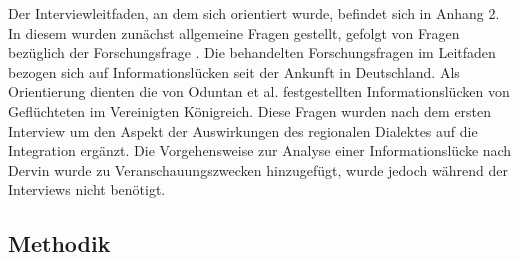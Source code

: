 

Der Interviewleitfaden, an dem sich orientiert wurde, befindet sich in Anhang 2. In diesem wurden zunächst allgemeine Fragen gestellt, gefolgt von Fragen bezüglich der Forschungsfrage .\newline
Die behandelten Forschungsfragen im Leitfaden bezogen sich auf Informationslücken   seit der Ankunft in Deutschland. Als Orientierung dienten die von Oduntan et al. festgestellten Informationslücken von Geflüchteten im Vereinigten Königreich\citep{oduntan2017investigating}.\newline
Diese Fragen wurden nach dem ersten Interview um den Aspekt der Auswirkungen des regionalen Dialektes auf die Integration ergänzt.\newline
Die Vorgehensweise zur Analyse einer Informationslücke nach Dervin wurde zu Veranschauungszwecken hinzugefügt, wurde jedoch während der Interviews nicht benötigt.\citep{dervin2003sense}

\subsection{Methodik}

